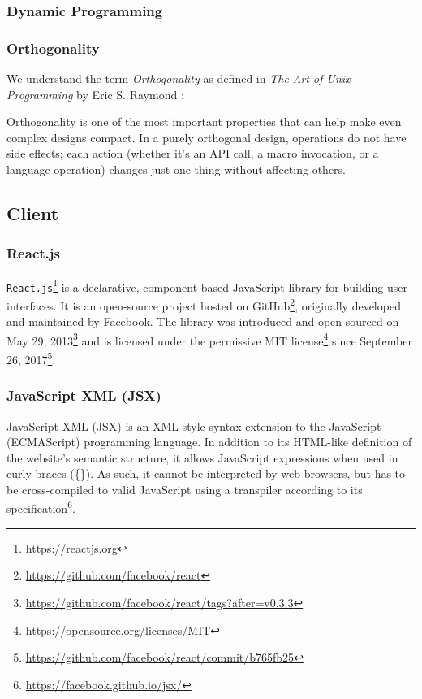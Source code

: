 \subsubsection{Dynamic Programming}

\subsubsection{Orthogonality}
We understand the term \textit{Orthogonality} as defined in \textit{The Art of Unix Programming} by Eric S. Raymond \cite{raymond2003compactness}:
\begin{definition}
    Orthogonality is one of the most important properties that can help make even complex designs compact. In a purely orthogonal design, operations do not have side effects; each action (whether it's an API call, a macro invocation, or a language operation) changes just one thing without affecting others.
\end{definition}

\subsection{Client}
\subsubsection{React.js}
\texttt{React.js}\footnote{\url{https://reactjs.org}} is a declarative, component-based JavaScript library for building user interfaces. 
It is an open-source project hosted on GitHub\footnote{\url{https://github.com/facebook/react}}, originally developed and maintained by Facebook.
The library was introduced and open-sourced on May 29, 2013\footnote{\url{https://github.com/facebook/react/tags?after=v0.3.3}} and is licensed under the permissive MIT license\footnote{\url{https://opensource.org/licenses/MIT}} since September 26, 2017\footnote{\url{https://github.com/facebook/react/commit/b765fb25}}.

\subsubsection{JavaScript XML (JSX)}
JavaScript XML (JSX) is an XML-style syntax extension to the JavaScript (ECMAScript) programming language.
In addition to its HTML-like definition of the website's semantic structure, it allows JavaScript expressions when used in curly braces (\{\}).
As such, it cannot be interpreted by web browsers, but has to be cross-compiled to valid JavaScript using a transpiler according to its specification\footnote{\url{https://facebook.github.io/jsx/}}.


